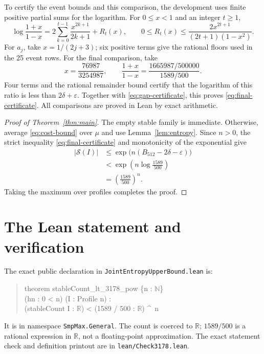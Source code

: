 \documentclass[11pt,letterpaper]{article}
\theoremstyle{remark}
\newcommand{\N}{\mathbb{N}}
\newcommand{\R}{\mathbb{R}}
\newcommand{\cS}{\mathcal{S}}
\newcommand{\code}[1]{\texttt{#1}}
\numberwithin{equation}{section}
\begin{document}
To certify the event bounds and this comparison, the development uses
finite positive partial sums for the logarithm. For \(0\le x<1\)
and an integer \(t\ge1\),
\begin{equation}\label{eq:log-series}
  \log\frac{1+x}{1-x}
  =2\sum_{k=0}^{t-1}\frac{x^{2k+1}}{2k+1}+R_t(x),
  \qquad
  0\le R_t(x)\le
  \frac{2x^{2t+1}}{(2t+1)(1-x^2)}.
\end{equation}
For \(a_j\), take \(x=1/(2j+3)\); six positive terms give the
rational floors used in the 25 event rows. For the final comparison,
take
\begin{equation}\label{eq:ratio}
  x=\frac{76987}{3254987},
  \qquad
  \frac{1+x}{1-x}
  =\frac{1665987/500000}{1589/500}.
\end{equation}
Four terms and the rational remainder bound certify that the logarithm
of this ratio is less than \(2\delta+\varepsilon\). Together with
\eqref{eq:gap-certificate}, this proves \eqref{eq:final-certificate}.
All comparisons are proved in Lean by exact arithmetic.

\begin{proof}[Proof of Theorem~\ref{thm:main}]
The empty stable family is immediate. Otherwise, average
\eqref{eq:cost-bound} over \(\mu\) and use
Lemma~\ref{lem:entropy}. Since \(n>0\), the strict inequality
\eqref{eq:final-certificate} and monotonicity of the exponential give
\begin{align*}
  |\cS(I)|
  &\le\exp\!\bigl(n(B_{512}-2\delta-\varepsilon)\bigr)\\
  &<\exp\!\left(n\log\frac{1589}{500}\right)\\
  &=\left(\frac{1589}{500}\right)^n.
\end{align*}
Taking the maximum over profiles completes the proof.
\end{proof}

\appendix
\section{The Lean statement and verification}
\label{app:lean}

The exact public declaration in
\code{JointEntropyUpperBound.lean} is:
\begin{quote}\small\ttfamily
theorem stableCount\_lt\_3178\_pow \{n : \(\N\)\}\\
\hspace*{1em}(hn : 0 < n) (I : Profile n) :\\
\hspace*{1em}(stableCount I : \(\R\)) < (1589 / 500 : \(\R\)) \textasciicircum\ n
\end{quote}
It is in namespace \code{SmpMax.General}. The count is coerced to
\(\R\); \(1589/500\) is a rational expression in \(\R\), not a
floating-point approximation. The exact statement check and definition
printout are in \code{lean/Check3178.lean}.
\end{document}
